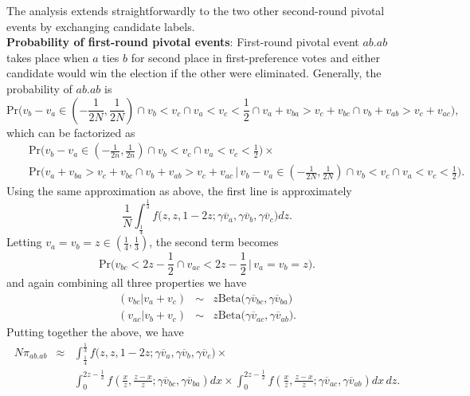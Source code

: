 \documentclass[11pt,a4paper]{article}
\begin{document}
The analysis extends straightforwardly to the two other second-round pivotal events by exchanging candidate labels.   
 \\

\noindent \textbf{Probability of first-round pivotal events}:
First-round pivotal event $ab.ab$ takes place when $a$ ties $b$ for second place in first-preference votes and either candidate would win the election if the other were eliminated. Generally, the probability of $ab.ab$ is  
\begin{equation}
\text{Pr}\bigg(v_b - v_a \in \left(-\frac{1}{2N}, \frac{1}{2N}\right) \cap v_b < v_c  \cap v_a < v_c < \frac{1}{2} \cap v_a + v_{ba} > v_c + v_{bc} \cap v_b + v_{ab} > v_c + v_{ac}\bigg), \label{p.ab.ab}
\end{equation}  
which can be factorized as 
\begin{eqnarray}
&& \text{Pr}\bigg(v_b - v_a \in \left(-\frac{1}{2n}, \frac{1}{2n}\right) \cap v_b < v_c \cap v_a < v_c < \frac{1}{2}\bigg) \times  \nonumber \\ 
&& \text{Pr} \bigg( v_a + v_{ba} > v_c + v_{bc} \cap v_b + v_{ab} > v_c + v_{ac} \, \bigg| \, v_b - v_a \in \left(-\frac{1}{2N}, \frac{1}{2N}\right) \cap v_b < v_c \cap v_a < v_c < \frac{1}{2}\bigg).  \nonumber
\end{eqnarray}
Using the same approximation as above, the first line is approximately 
\[
\frac{1}{N} \int_{\frac{1}{4}}^{\frac{1}{3}} f\bigg(z,z,1-2z; \gamma \overline{v}_a, \gamma \overline{v}_b, \gamma \overline{v}_c \bigg) dz.
\]
Letting $v_a = v_b = z \in \left(\frac{1}{4}, \frac{1}{3} \right)$, the second term becomes 
\begin{equation}
\mathrm{Pr}\big( v_{bc} < 2z - \frac{1}{2} \cap v_{ac} < 2z - \frac{1}{2} \, \bigg| \, v_a = v_b = z \big). 
\end{equation}
and again combining all three properties we have 
\begin{eqnarray}
(v_{bc} | v_a + v_c ) &\sim& z \mathrm{Beta}\big( \gamma \overline{v}_{bc}, \gamma \overline{v}_{ba} \big) \nonumber \\ 
(v_{ac} | v_b + v_c ) &\sim& z \mathrm{Beta}\big( \gamma \overline{v}_{ac}, \gamma \overline{v}_{ab} \big). \nonumber  
\end{eqnarray} 
Putting together the above, we have 
\begin{eqnarray}
N \pi_{ab.ab} &\approx&   \int_{\frac{1}{4}}^{\frac{1}{3}} f\bigg(z,z,1-2z; \gamma \overline{v}_a, \gamma \overline{v}_b, \gamma \overline{v}_c \bigg) \times \nonumber \\ &&  \int_0^{2z - \frac{1}{2}} f\left( \frac{x}{z}, \frac{z - x}{z}; \gamma \overline{v}_{bc}, \gamma \overline{v}_{ba} \right) dx \times  \int_0^{2z - \frac{1}{2}} f\left( \frac{x}{z}, \frac{z - x}{z}; \gamma \overline{v}_{ac}, \gamma \overline{v}_{ab} \right)  dx \, dz.  \label{p.ab.ab.int} 
\end{eqnarray}
\end{document}
